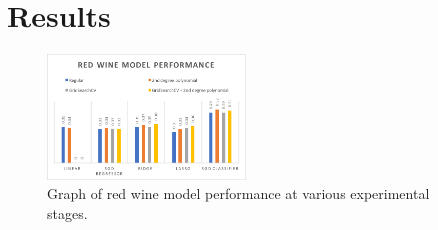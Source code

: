 
\section{Results}
\label{sec:results}

\begin{figure}[htb]

  \centering  %

  \includegraphics[width=0.47\textwidth]{redwine_score.png}

  \caption{Graph of red wine model performance at various experimental stages.}

  \label{fig:tex}

  \end{figure}

